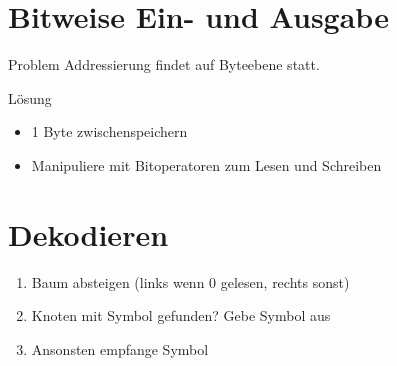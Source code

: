 \documentclass[utf8x]{beamer}
\begin{document}
    
    \section{Bitweise Ein- und Ausgabe}
    \frame{\tableofcontents[currentsection]}
    \begin{frame}[<+->]
    
        \begin{block}{Problem}
            Addressierung findet auf Byteebene statt.

        \end{block}
        
        \begin{block}{Lösung}
            \begin{itemize}
                \item
                    1 Byte zwischenspeichern

                \item
                    Manipuliere mit Bitoperatoren zum Lesen und Schreiben

            \end{itemize}
        \end{block}
    \end{frame}
    \section{Dekodieren}
    \frame{\tableofcontents[currentsection]}
    \begin{frame}[<+->]
    
        \begin{enumerate}[1.]
            \item
                Baum absteigen (links wenn 0 gelesen, rechts sonst)

            \item
                Knoten mit Symbol gefunden? Gebe Symbol aus
            \item
                Ansonsten empfange Symbol

        \end{enumerate}

    \end{frame}
    
\end{document}
